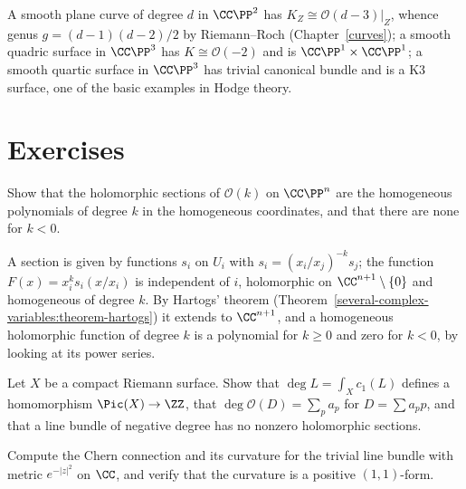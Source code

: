 \begin{example}\label{holomorphic-bundles:example-adjunction}
A smooth plane curve of degree $d$ in $\CC\PP^2$ has $K_Z \cong \mathcal{O}(d - 3)|_Z$, whence genus $g = (d-1)(d-2)/2$ by Riemann--Roch (Chapter~\ref{curves}); a smooth quadric surface in $\CC\PP^3$ has
$K \cong \mathcal{O}(-2)$ and is $\CC\PP^1 \times \CC\PP^1$; a smooth quartic surface in $\CC\PP^3$ has trivial canonical bundle and is a K3 surface, one of the basic examples in Hodge theory.
\end{example}

\section{Exercises}\label{holomorphic-bundles:section-exercises}

\begin{exercise}\label{holomorphic-bundles:exercise-sections-ok}
Show that the holomorphic sections of $\mathcal{O}(k)$ on $\CC\PP^n$ are the homogeneous polynomials of degree $k$ in the homogeneous coordinates, and that there are none for $k < 0$.
\end{exercise}

\begin{solution}
A section is given by functions $s_i$ on $U_i$ with $s_i = (x_i/x_j)^{-k}s_j$; the function $F(x) = x_i^ks_i(x/x_i)$ is independent of $i$, holomorphic on $\CC^{n+1} \setminus \{0\}$ and homogeneous of degree
$k$. By Hartogs' theorem (Theorem~\ref{several-complex-variables:theorem-hartogs}) it extends to $\CC^{n+1}$, and a homogeneous holomorphic function of degree $k$ is a polynomial for $k \geq 0$ and zero for
$k < 0$, by looking at its power series.
\end{solution}

\begin{exercise}\label{holomorphic-bundles:exercise-degree-line-bundle}
Let $X$ be a compact Riemann surface. Show that $\deg L = \int_Xc_1(L)$ defines a homomorphism $\Pic(X) \to \ZZ$, that $\deg\mathcal{O}(D) = \sum_pa_p$ for $D = \sum a_pp$, and that a line bundle of negative
degree has no nonzero holomorphic sections.
\end{exercise}

\begin{exercise}\label{holomorphic-bundles:exercise-chern-connection-trivial}
Compute the Chern connection and its curvature for the trivial line bundle with metric $e^{-|z|^2}$ on $\CC$, and verify that the curvature is a positive $(1,1)$-form.
\end{exercise}

